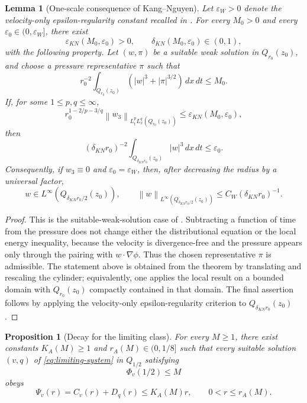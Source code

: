 \documentclass[pdflatex,sn-mathphys-num]{sn-jnl}
\numberwithin{equation}{section}
\theoremstyle{thmstyleone}
\newtheorem{proposition}[theorem]{Proposition}
\newtheorem{lemma}[theorem]{Lemma}
\theoremstyle{thmstylethree}
\newcommand{\eps}{\varepsilon}
\newcommand{\dxdt}{\,dx\,dt}
\newcommand{\norm}[2]{\left\|#1\right\|_{#2}}
\begin{document}
\begin{lemma}[One-scale consequence of Kang--Nguyen]
\label{lem:KN}
Let \(\eps_W>0\) denote the velocity-only epsilon-regularity constant recalled in \cite{KangNguyen2023}.  For every \(M_0>0\) and every \(\eps_0\in(0,\eps_W]\), there exist
\[
        \eps_{KN}(M_0,\eps_0)>0,
        \qquad
        \delta_{KN}(M_0,\eps_0)\in(0,1),
\]
with the following property.  Let \((w,\pi)\) be a suitable weak solution in \(Q_{r_0}(z_0)\), and choose a pressure representative \(\pi\) such that
\[
        r_0^{-2}\int_{Q_{r_0}(z_0)}(|w|^3+|\pi|^{3/2})\dxdt\le M_0.
\]
If, for some \(1\le p,q\le\infty\),
\[
        r_0^{1-2/p-3/q}
        \norm{w_3}{L^p_tL^q_x(Q_{r_0}(z_0))}
        \le \eps_{KN}(M_0,\eps_0),
\]
then
\[
        (\delta_{KN}r_0)^{-2}
        \int_{Q_{\delta_{KN}r_0}(z_0)}|w|^3\dxdt
        \le \eps_0.
\]
Consequently, if \(w_3\equiv0\) and \(\eps_0=\eps_W\), then, after decreasing the radius by a universal factor,
\[
        w\in L^\infty(Q_{\delta_{KN}r_0/2}(z_0)),
        \qquad
        \norm{w}{L^\infty(Q_{\delta_{KN}r_0/2}(z_0))}
        \le C_W(\delta_{KN}r_0)^{-1}.
\]
\end{lemma}

\begin{proof}
This is the suitable-weak-solution case of \cite[Theorem 1.3]{KangNguyen2023}.  Subtracting a function of time from the pressure does not change either the distributional equation or the local energy inequality, because the velocity is divergence-free and the pressure appears only through the pairing with \(w\cdot\nabla\phi\).  Thus the chosen representative \(\pi\) is admissible.  The statement above is obtained from the theorem by translating and rescaling the cylinder; equivalently, one applies the local result on a bounded domain with \(Q_{r_0}(z_0)\) compactly contained in that domain.  The final assertion follows by applying the velocity-only epsilon-regularity criterion to \(Q_{\delta_{KN}r_0}(z_0)\).
\end{proof}

\begin{proposition}[Decay for the limiting class]
\label{prop:limiting-decay}
For every \(M\ge1\), there exist constants \(K_A(M)\ge1\) and \(r_A(M)\in(0,1/8]\) such that every suitable solution \((v,q)\) of \eqref{eq:limiting-system} in \(Q_{1/2}\) satisfying
\[
        \Phi_v(1/2)\le M
\]
obeys
\begin{equation}
        \Psi_v(r)=C_v(r)+D_q(r)\le K_A(M)r,
        \qquad 0<r\le r_A(M).
        \label{eq:limiting-decay}
\end{equation}
\end{proposition}
\end{document}
